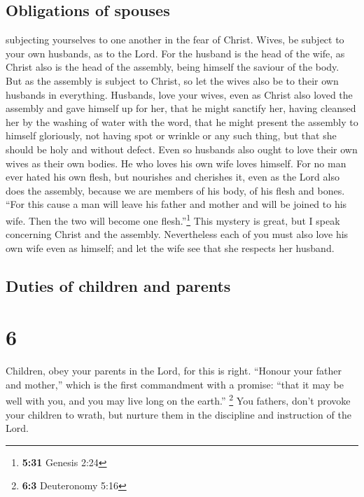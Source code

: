 \hypertarget{obligations-of-spouses}{%
\subsection{Obligations of spouses}\label{obligations-of-spouses}}

 subjecting yourselves to one another in the fear of
Christ.  Wives, be subject to your own husbands, as to
the Lord.  For the husband is the head of the wife, as
Christ also is the head of the assembly, being himself the saviour of
the body.  But as the assembly is subject to Christ, so
let the wives also be to their own husbands in everything.
 Husbands, love your wives, even as Christ also loved the
assembly and gave himself up for her,  that he might
sanctify her, having cleansed her by the washing of water with the word,
 that he might present the assembly to himself
gloriously, not having spot or wrinkle or any such thing, but that she
should be holy and without defect.  Even so husbands also
ought to love their own wives as their own bodies. He who loves his own
wife loves himself.  For no man ever hated his own flesh,
but nourishes and cherishes it, even as the Lord also does the assembly,
 because we are members of his body, of his flesh and
bones.  ``For this cause a man will leave his father and
mother and will be joined to his wife. Then the two will become one
flesh.''\footnote{\textbf{5:31} Genesis 2:24}  This
mystery is great, but I speak concerning Christ and the assembly.
 Nevertheless each of you must also love his own wife
even as himself; and let the wife see that she respects her husband.

\hypertarget{duties-of-children-and-parents}{%
\subsection{Duties of children and
parents}\label{duties-of-children-and-parents}}

\hypertarget{section-5}{%
\section{6}\label{section-5}}

 Children, obey your parents in the Lord, for this is
right.  ``Honour your father and mother,'' which is the
first commandment with a promise:  ``that it may be well
with you, and you may live long on the earth.'' \footnote{\textbf{6:3}
  Deuteronomy 5:16}  You fathers, don't provoke your
children to wrath, but nurture them in the discipline and instruction of
the Lord.

